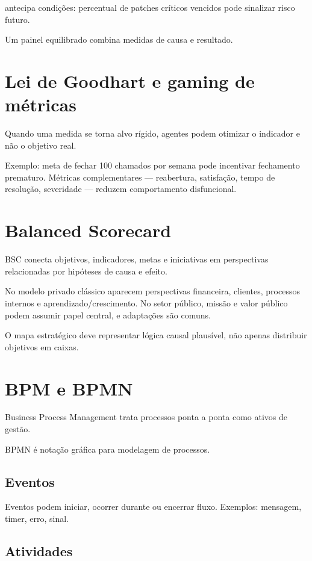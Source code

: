  antecipa condições: percentual de patches críticos vencidos pode sinalizar risco futuro.

Um painel equilibrado combina medidas de causa e resultado.

\section{Lei de Goodhart e gaming de métricas}

Quando uma medida se torna alvo rígido, agentes podem otimizar o indicador e não o objetivo real.

Exemplo: meta de fechar 100 chamados por semana pode incentivar fechamento prematuro. Métricas complementares — reabertura, satisfação, tempo de resolução, severidade — reduzem comportamento disfuncional.

\section{Balanced Scorecard}

BSC conecta objetivos, indicadores, metas e iniciativas em perspectivas relacionadas por hipóteses de causa e efeito.

No modelo privado clássico aparecem perspectivas financeira, clientes, processos internos e aprendizado/crescimento. No setor público, missão e valor público podem assumir papel central, e adaptações são comuns.

O mapa estratégico deve representar lógica causal plausível, não apenas distribuir objetivos em caixas.

\section{BPM e BPMN}

Business Process Management trata processos ponta a ponta como ativos de gestão.

BPMN é notação gráfica para modelagem de processos.

\subsection{Eventos}

Eventos podem iniciar, ocorrer durante ou encerrar fluxo. Exemplos: mensagem, timer, erro, sinal.

\subsection{Atividades}


